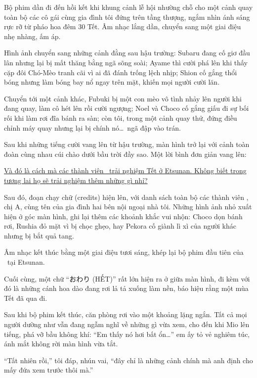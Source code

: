 \documentclass[../main.tex]{subfiles}
\begin{document}
Bộ phim dần đi đến hồi kết khi khung cảnh lễ hội nhường chỗ cho một cảnh quay toàn bộ các cô gái cùng gia đình tôi đứng trên tầng thượng, ngắm nhìn ánh sáng rực rỡ từ pháo hoa đêm 30 Tết. Âm nhạc lắng dần, chuyển sang một giai điệu nhẹ nhàng, ấm áp.

Hình ảnh chuyển sang những cảnh đằng sau hậu trường: Subaru đang cố giơ đầu lân nhưng lại bị mất thăng bằng ngã sõng soài; Ayame thì cười phá lên khi thấy cặp đôi Chó-Mèo tranh cãi vì ai đã đánh trống lệch nhịp; Shion cố gắng thổi bóng nhưng làm bóng bay nổ ngay trên mặt, khiến mọi người cười lăn.

Chuyển tới một cảnh khác, Fubuki bị một con mèo vô tình nhảy lên người khi đang quay, làm cô hét lên rồi cười ngượng; Noel và Choco cố gắng giấu đi sự bối rối khi làm rơi đĩa bánh ra sàn; còn tôi, trong một cảnh quay thử, đứng điều chỉnh máy quay nhưng lại bị chính nó\dots\ ngã đập vào trán.

Sau khi những tiếng cười vang lên từ hậu trường, màn hình trở lại với cảnh toàn đoàn cùng nhau cúi chào dưới bầu trời đầy sao. Một lời bình đơn giản vang lên:

\begin{center}
    \uline{Và đó là cách mà các thành viên \hll\ trải nghiệm Tết ở Etsunan. Không biết trong tương lai họ sẽ trải nghiệm thêm những gì nhỉ?}
\end{center}

Sau đó, đoạn chạy chữ (credits) hiện lên, với danh sách toàn bộ các thành viên \hll, chị A, cùng tên của gia đình hai bên nội ngoại nhà tôi. Những hình ảnh nhỏ xuất hiện ở góc màn hình, ghi lại thêm các khoảnh khắc vui nhộn: Choco dọn bánh rơi, Rushia đỏ mặt vì bị chọc ghẹo, hay Pekora cố giành lì xì của người khác nhưng bị bắt quả tang.

Âm nhạc kết thúc bằng một giai điệu tươi sáng, khép lại bộ phim đầu tiên của \hll\ tại Etsunan.

Cuối cùng, một chữ ``おわり (HẾT)'' rất lớn hiện ra ở giữa màn hình, đi kèm với đó là những cánh hoa dào đang rơi lả tả xuống làm nền, báo hiệu rằng một mùa Tết đã qua đi.

\ct

Sau khi bộ phim kết thúc, căn phòng rơi vào một khoảng lặng ngắn. Tất cả mọi người dường như vẫn đang ngẫm nghĩ về những gì vừa xem, cho đến khi Mio lên tiếng, phá vỡ bầu không khí: ``Em thấy nó hơi bất ổn\dots'' em ấy tỏ vẻ nghiêm túc, ánh mắt không rời màn hình vừa tắt.

``Tất nhiên rồi,'' tôi đáp, nhún vai, ``đây chỉ là những cảnh chính mà anh định cho mấy đứa xem trước thôi mà.''
\end{document}
